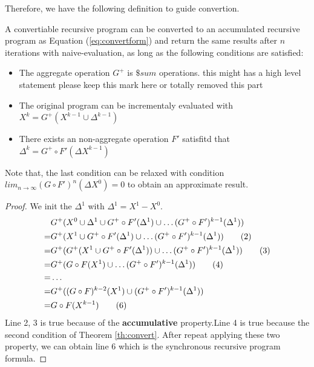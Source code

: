 Therefore, we have the following definition to guide convertion.
\begin{definition}
	\label{th:convert}
	A convertiable recursive program can be converted to an accumulated recursive program as Equation (\ref{eq:convertform}) and return the same results after $n$ iterations with naive-evaluation, as long as the following conditions are satisfied:
	\begin{itemize}
		\item The aggregate operation $G^+$ is $\$sum$ operations.{\color{blue} this  might has a high level statement please keep this mark here or totally removed this part}
		
		\item The original program can be incrementaly evaluated with $X^{k}=G^+(X^{k-1}\cup \Delta^{k-1})$
		\item There exists an non-aggregate operation $F'$ satisfitd that $\Delta^{k}=G^+\circ F'(\Delta X^{k-1})$
		
		
	\end{itemize}
\end{definition}
{\color{green}
	Note that, the last condition can be relaxed with condition $lim_{n\rightarrow\infty}(G\circ F')^n(\Delta X^0)=0$ to obtain an approximate result.
}
\begin{proof}
	We init the $\Delta^1$ with $\Delta^1=X^1-X^0$.
	\begin{align}
	&G^+(X^0\cup \Delta^1 \cup G^+\circ F'(\Delta^1)\cup \ldots (G^+ \circ F')^{k-1}(\Delta^1 )) \notag\\
	=&G^+(X^1 \cup G^+\circ F'(\Delta^1  )\cup \ldots (G^+ \circ F')^{k-1}(\Delta^1  )) \tag{2}\\
	=&G^+(G^+(X^1\cup G^+\circ F'(\Delta^1  ))\cup \ldots (G^+ \circ F')^{k-1}(\Delta^1 )) \tag{3}\\
	=&G^+(G\circ F(X^1)\cup \ldots (G^+ \circ F')^{k-1}(\Delta^1 )) \tag{4}\\
	=&\ldots \notag\\
	=&G^+((G\circ F)^{k-2}(X^1)\cup(G^+ \circ F')^{k-1}(\Delta^1 )) \notag\\
	=&G\circ F(X^{k-1})\tag{6}
	\end{align}
	Line 2, 3 is true because of the \textbf{accumulative} property.Line 4 is true because the second condition of Theorem \ref{th:convert}. After repeat applying these two property, we can obtain line 6 which is the synchronous recursive program formula.
\end{proof}

